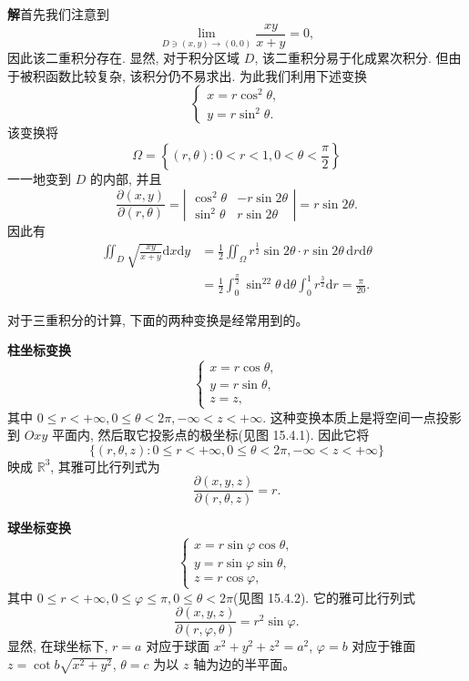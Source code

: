 \documentclass[UTF8,12pt,a4paper,fontset=fandol]{ctexart}
\begin{document}
\noindent\textbf{解}\quad 首先我们注意到
\[
  \lim_{D\ni(x,y)\to(0,0)}\frac{xy}{x+y}=0,
\]
因此该二重积分存在. 显然, 对于积分区域 $D$, 该二重积分易于化成累次积分. 但由于被积函数比较复杂, 该积分仍不易求出. 为此我们利用下述变换
\[
  \begin{cases}
    x=r\cos^2\theta,\\
    y=r\sin^2\theta.
  \end{cases}
\]
该变换将
\[
  \Omega=\left\{(r,\theta):0<r<1,0<\theta<\frac\pi2\right\}
\]
一一地变到 $D$ 的内部, 并且
\[
  \frac{\partial(x,y)}{\partial(r,\theta)}
  =\left|\begin{matrix}
    \cos^2\theta&-r\sin2\theta\\
    \sin^2\theta&r\sin2\theta
  \end{matrix}\right|
  =r\sin2\theta.
\]
因此有
\[
\begin{aligned}
  \iint_D\sqrt{\frac{xy}{x+y}}\mathrm dx\mathrm dy
  &=\frac12\iint_\Omega r^{\frac12}\sin2\theta\cdot r\sin2\theta\,\mathrm dr\mathrm d\theta\\
  &=\frac12\int_0^{\frac\pi2}\sin^22\theta\,\mathrm d\theta\int_0^1 r^{\frac32}\mathrm dr
  =\frac\pi{20}.
\end{aligned}
\]

对于三重积分的计算, 下面的两种变换是经常用到的。

\noindent\textbf{柱坐标变换}
\[
  \begin{cases}
    x=r\cos\theta,\\
    y=r\sin\theta,\\
    z=z,
  \end{cases}
\]
其中 $0\leqslant r<+\infty,0\leqslant\theta<2\pi,-\infty<z<+\infty$. 这种变换本质上是将空间一点投影到 $Oxy$ 平面内, 然后取它投影点的极坐标(见图 15.4.1). 因此它将
\[
  \{(r,\theta,z):0\leqslant r<+\infty,0\leqslant\theta<2\pi,-\infty<z<+\infty\}
\]
映成 $\mathbb R^3$, 其雅可比行列式为
\[
  \frac{\partial(x,y,z)}{\partial(r,\theta,z)}=r.
\]

\noindent\textbf{球坐标变换}
\[
  \begin{cases}
    x=r\sin\varphi\cos\theta,\\
    y=r\sin\varphi\sin\theta,\\
    z=r\cos\varphi,
  \end{cases}
\]
其中 $0\leqslant r<+\infty,0\leqslant\varphi\leqslant\pi,0\leqslant\theta<2\pi$(见图 15.4.2). 它的雅可比行列式
\[
  \frac{\partial(x,y,z)}{\partial(r,\varphi,\theta)}=r^2\sin\varphi.
\]
显然, 在球坐标下, $r=a$ 对应于球面 $x^2+y^2+z^2=a^2$, $\varphi=b$ 对应于锥面 $z=\cot b\sqrt{x^2+y^2}$, $\theta=c$ 为以 $z$ 轴为边的半平面。
\end{document}

